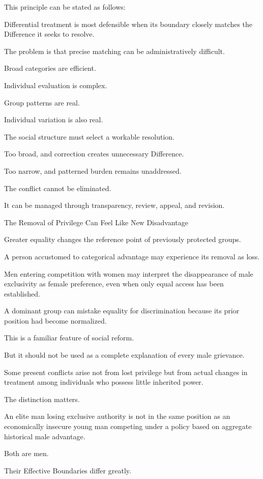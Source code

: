 This principle can be stated as follows:

Differential treatment is most defensible when its boundary closely matches the Difference it seeks to resolve.

The problem is that precise matching can be administratively difficult.

Broad categories are efficient.

Individual evaluation is complex.

Group patterns are real.

Individual variation is also real.

The social structure must select a workable resolution.

Too broad, and correction creates unnecessary Difference.

Too narrow, and patterned burden remains unaddressed.

The conflict cannot be eliminated.

It can be managed through transparency, review, appeal, and revision.

The Removal of Privilege Can Feel Like New Disadvantage

Greater equality changes the reference point of previously protected groups.

A person accustomed to categorical advantage may experience its removal as loss.

Men entering competition with women may interpret the disappearance of male exclusivity as female preference, even when only equal access has been established.

A dominant group can mistake equality for discrimination because its prior position had become normalized.

This is a familiar feature of social reform.

But it should not be used as a complete explanation of every male grievance.

Some present conflicts arise not from lost privilege but from actual changes in treatment among individuals who possess little inherited power.

The distinction matters.

An elite man losing exclusive authority is not in the same position as an economically insecure young man competing under a policy based on aggregate historical male advantage.

Both are men.

Their Effective Boundaries differ greatly.

